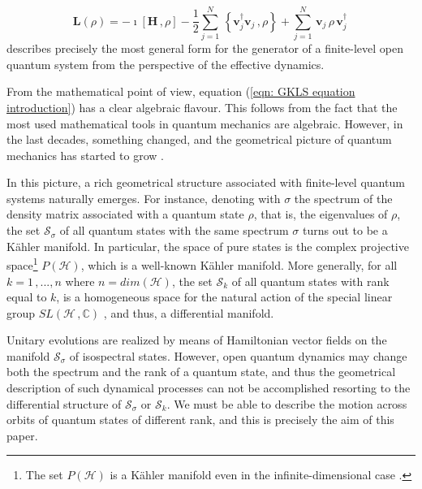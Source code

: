 \documentclass[11pt]{article}
\newcommand{\be}{\begin{equation}}
\newcommand{\ee}{\end{equation}}
\newcommand{\vsp}{\vspace{0.4cm}}
\newcommand{\stsp}{\mathcal{S}}
\begin{document}
\be\label{eqn: GKLS equation introduction}
\mathbf{L}(\rho)=-\imath\left[\mathbf{H}\,,\rho\right] - \frac{1}{2}\sum_{j=1}^{N}\,\left\{\mathbf{v}_{j}^{\dagger}\mathbf{v}_{j}\,,\rho\right\} + \sum_{j=1}^{N}\,\mathbf{v}_{j}\,\rho\,\mathbf{v}_{j}^{\dagger}\,
\ee
describes precisely the most general form for the generator of a finite-level open quantum system from the perspective of the effective dynamics.


\vsp

From the mathematical point of view, equation (\ref{eqn: GKLS equation introduction}) has a clear algebraic flavour.
This follows from the fact that the most used mathematical tools in quantum mechanics are algebraic.
However, in the last decades, something changed, and the geometrical picture of quantum mechanics has started to grow \cite{ashtekar_schilling-geometrical_formulation_of_quantum_mechanics,cirelli_mania_pizzocchero-quantum_mechanics_as_an_infinite_dimensional_Hamiltonian_system_with_uncertainty_structure,ercolessi_marmo_morandi-from_the_equations_of_motion_to_the_canonical_commutation_relations,carinena_clemente-gallardo_marmo-geometrization_of_quantum_mechanics,chruscinski_jamiolkowski-geometric_phases_in_classical_and_quantum_mechanics,bengtsson_zyczkowski-geometry_of_quantum_states:_an_introduction_to_quantum_entanglement}.

In this picture, a rich geometrical structure associated with finite-level quantum systems naturally emerges.
For instance, denoting with $\sigma$ the spectrum of the density matrix associated with a quantum state $\rho$, that is, the eigenvalues of $\rho$, the set $\stsp_{\sigma}$ of all  quantum states with the same spectrum $\sigma$ turns out to be a K\"{a}hler manifold.
In particular, the space of pure states is the complex projective space\footnote{The set $P(\mathcal{H})$ is a K\"{a}hler manifold even in the infinite-dimensional case \cite{cirelli_lanzavecchia_mania-normal_pure_states_and_the_von_neumann_algebra_of_bounded_operators_as_kahler_manifold}.} $P(\mathcal{H})$, which is a well-known K\"{a}hler manifold.
More generally, for all $k=1\,,...,n$ where $n=dim(\mathcal{H})$, the set $\stsp_{k}$ of all quantum states with rank equal to $k$, is a homogeneous space for the natural action of the special linear group $SL(\mathcal{H}\,,\mathbb{C})$ \cite{grabowski_kus_marmo-symmetries_group_actions_and_entanglement,grabowski_kus_marmo-geometry_of_quantum_systems_density_states_and_entanglement}, and thus, a differential manifold.


Unitary evolutions are realized by means of Hamiltonian vector fields on the manifold $\stsp_{\sigma}$ of isospectral states.
However, open quantum dynamics may change both the spectrum and the rank of a quantum state, and thus the geometrical description of such dynamical processes can not be accomplished resorting to  the differential structure of $\stsp_{\sigma}$ or $\stsp_{k}$.
We must be able to describe the motion across orbits of quantum states of different rank, and this is precisely the aim of this paper.
\end{document}
